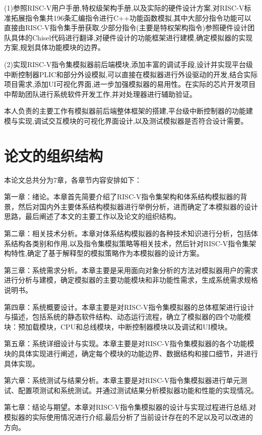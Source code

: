 (1)参照RISC-V用户手册,特权级架构手册,以及实际的硬件设计方案,对RISC-V标准拓展指令集共196条汇编指令进行C++功能函数模拟,其中大部分指令功能可以直接由RISC-V指令集手册获取,少部分指令(主要是特权架构指令)参照硬件设计团队具体的Chisel代码进行翻译,对硬件设计的功能框架进行建模,确定模拟器的实现方案,规划具体功能模块的边界。


(2)实现RISC-V指令集模拟器前后端模块,添加丰富的调试手段,设计并实现平台级中断控制器PLIC和部分外设模拟,可以直接在模拟器进行外设驱动的开发,结合实际项目需求,添加UI可视化界面,进一步加强模拟器的易用性。在实际的芯片开发项目中帮助团队进行系统软件开发工作,并对处理器进行辅助验证。


本人负责的主要工作有模拟器前后端整体框架的搭建,平台级中断控制器的功能建模与实现,调试交互模块的可视化界面设计,以及测试模拟器是否符合设计需要。


\section{论文的组织结构}
本论文总共分为7章，各章节内容安排如下：


第一章：绪论。本章首先简要介绍了RISC-V指令集架构和体系结构模拟器的背景，然后对国内外主要体系结构模拟器进行举例分析，进而确定了本模拟器的设计思路，最后阐述了本文的主要工作以及论文的组织结构。


第二章：相关技术分析。本章对体系结构模拟器的各种技术知识进行分析，包括体系结构各类别和作用,以及指令集模拟策略等相关技术，然后针对RISC-V指令集架构特性,确定了基于解释型的模拟策略作为本模拟器的设计方案。


第三章：系统需求分析。本章主要是采用面向对象分析的方法对模拟器用户的需求进行分析与建模，确定模拟器的主要功能模块和非功能性需求，生成系统需求规格说明书。


第四章：系统概要设计。本章主要是对RISC-V指令集模拟器的总体框架进行设计与描述，包括系统的静态软件结构、动态运行流程，确立了模拟器的四个功能模块：预加载模块，CPU和总线模块，中断控制器模块以及调试和UI模块。


第五章：系统详细设计与实现。本章主要是对RISC-V指令集模拟器的各个功能模块的具体实现进行阐述，确定每个模块的功能边界、数据结构和接口细节，并进行具体实现。


第六章：系统测试与结果分析。本章主要是对RISC-V指令集模拟器进行单元测试、配置项测试和系统测试。并通过测试结果分析模拟器功能和性能的实现情况。


第七章：结论与期望。本章对RISC-V指令集模拟器的设计与实现过程进行总结,对模拟器的实际使用情况进行介绍,最后分析了当前设计存在的不足以及可以改进的方向。


